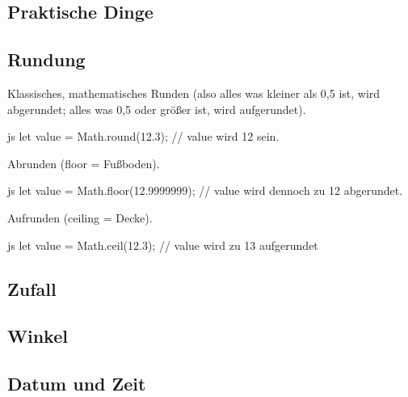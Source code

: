 \documentclass[10pt,a4paper]{article}
\begin{document}
\begin{multicols}{3}
\section*{Praktische Dinge}
\subsection*{Rundung}
Klassisches, mathematisches Runden (also alles was kleiner als 0,5 ist, wird abgerundet; alles was 0,5 oder größer ist, wird aufgerundet).
\begin{codebox}{js}{}
  let value = Math.round(12.3); // value wird 12 sein.
\end{codebox}
Abrunden (floor = Fußboden).
\begin{codebox}{js}{}
  let value = Math.floor(12.9999999); // value wird dennoch zu 12 abgerundet.
\end{codebox}
Aufrunden (ceiling = Decke).
\begin{codebox}{js}{}
  let value = Math.ceil(12.3); // value wird zu 13 aufgerundet
\end{codebox}

\subsection*{Zufall}
\subsection*{Winkel}
\subsection*{Datum und Zeit}



\printbibliography
{}
\end{multicols}
\end{document}
